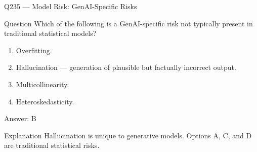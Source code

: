 \documentclass[aspectratio=169,8pt]{beamer}
\begin{document}
																																										\begin{frame}{Q235 --- Model Risk: GenAI-Specific Risks}
																																											\begin{block}{Question}
																																												Which of the following is a GenAI-specific risk not typically present in traditional statistical models?
																																												\begin{enumerate}
																																													\item Overfitting.
																																													\item Hallucination --- generation of plausible but factually incorrect output.
																																													\item Multicollinearity.
																																													\item Heteroskedasticity.
																																												\end{enumerate}  \end{block}
																																												\begin{exampleblock}{Answer: B}\end{exampleblock}
																																												\begin{block}{Explanation}
																																													Hallucination is unique to generative models. Options A, C, and D are traditional statistical risks.
																																												\end{block}
																																											\end{frame}
																																											
\end{document}
